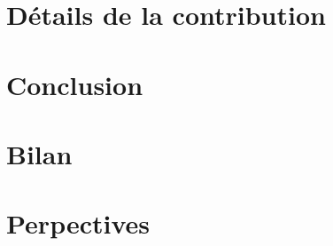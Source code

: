 \documentclass[french]{spimubphdthesis}
\begin{document}
 
 
 


\section{Détails de la contribution}

\section{Conclusion}
 
\section{Bilan}

\section{Perpectives}
 
\backmatter
 
 
 
 
 
 
 
 
 

%
 
\end{document}
